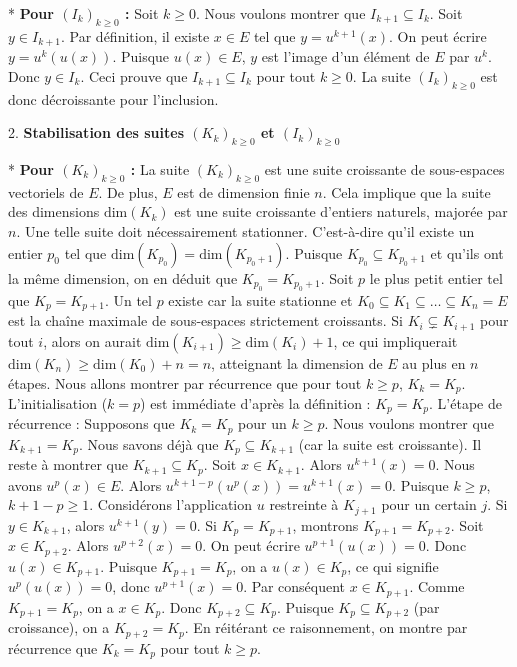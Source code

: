\documentclass{report}
\begin{document}
    *   \textbf{Pour $(I_k)_{k \ge 0}$ :}
        Soit $k \ge 0$. Nous voulons montrer que $I_{k+1} \subseteq I_k$.
        Soit $y \in I_{k+1}$. Par définition, il existe $x \in E$ tel que $y = u^{k+1}(x)$.
        On peut écrire $y = u^k(u(x))$.
        Puisque $u(x) \in E$, $y$ est l'image d'un élément de $E$ par $u^k$.
        Donc $y \in I_k$.
        Ceci prouve que $I_{k+1} \subseteq I_k$ pour tout $k \ge 0$. La suite $(I_k)_{k \ge 0}$ est donc décroissante pour l'inclusion.

2.  \textbf{Stabilisation des suites $(K_k)_{k \ge 0}$ et $(I_k)_{k \ge 0}$}

    *   \textbf{Pour $(K_k)_{k \ge 0}$ :}
        La suite $(K_k)_{k \ge 0}$ est une suite croissante de sous-espaces vectoriels de $E$.
        De plus, $E$ est de dimension finie $n$.
        Cela implique que la suite des dimensions $\mathrm{dim}(K_k)$ est une suite croissante d'entiers naturels, majorée par $n$.
        Une telle suite doit nécessairement stationner. C'est-à-dire qu'il existe un entier $p_0$ tel que $\mathrm{dim}(K_{p_0}) = \mathrm{dim}(K_{p_0+1})$.
        Puisque $K_{p_0} \subseteq K_{p_0+1}$ et qu'ils ont la même dimension, on en déduit que $K_{p_0} = K_{p_0+1}$.
        Soit $p$ le plus petit entier tel que $K_p = K_{p+1}$. Un tel $p$ existe car la suite stationne et $K_0 \subseteq K_1 \subseteq \dots \subseteq K_n = E$ est la chaîne maximale de sous-espaces strictement croissants. Si $K_i \subsetneq K_{i+1}$ pour tout $i$, alors on aurait $\mathrm{dim}(K_{i+1}) \ge \mathrm{dim}(K_i) + 1$, ce qui impliquerait $\mathrm{dim}(K_n) \ge \mathrm{dim}(K_0) + n = n$, atteignant la dimension de $E$ au plus en $n$ étapes.
        Nous allons montrer par récurrence que pour tout $k \ge p$, $K_k = K_p$.
        L'initialisation ($k=p$) est immédiate d'après la définition : $K_p = K_p$.
        L'étape de récurrence : Supposons que $K_k = K_p$ pour un $k \ge p$. Nous voulons montrer que $K_{k+1} = K_p$.
        Nous savons déjà que $K_p \subseteq K_{k+1}$ (car la suite est croissante).
        Il reste à montrer que $K_{k+1} \subseteq K_p$. Soit $x \in K_{k+1}$. Alors $u^{k+1}(x) = 0$.
        Nous avons $u^p(x) \in E$. Alors $u^{k+1-p}(u^p(x)) = u^{k+1}(x) = 0$.
        Puisque $k \ge p$, $k+1-p \ge 1$.
        Considérons l'application $u$ restreinte à $K_{j+1}$ pour un certain $j$.
        Si $y \in K_{k+1}$, alors $u^{k+1}(y)=0$.
        Si $K_p=K_{p+1}$, montrons $K_{p+1}=K_{p+2}$.
        Soit $x \in K_{p+2}$. Alors $u^{p+2}(x)=0$. On peut écrire $u^{p+1}(u(x))=0$. Donc $u(x) \in K_{p+1}$.
        Puisque $K_{p+1} = K_p$, on a $u(x) \in K_p$, ce qui signifie $u^p(u(x)) = 0$, donc $u^{p+1}(x) = 0$.
        Par conséquent $x \in K_{p+1}$. Comme $K_{p+1} = K_p$, on a $x \in K_p$.
        Donc $K_{p+2} \subseteq K_p$. Puisque $K_p \subseteq K_{p+2}$ (par croissance), on a $K_{p+2}=K_p$.
        En réitérant ce raisonnement, on montre par récurrence que $K_k=K_p$ pour tout $k \ge p$.
\end{document}
